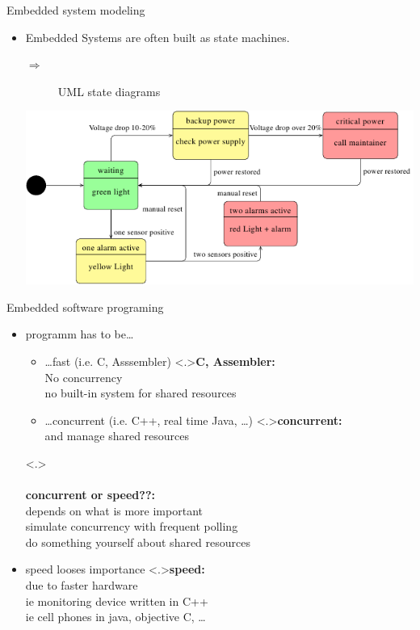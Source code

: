 \documentclass[ngerman={babel}, utf8, bigger, xcolor={table,dvipsnames}, ompress, hyperref={bookmarks,colorlinks}]{beamer}
\begin{document}
\begin{frame}{Embedded system modeling}
	\begin{itemize}
		\item Embedded Systems are often built as state machines.
		\begin{description}
			\item[ $\Rightarrow$] UML state diagrams
		\end{description}
		\hspace{-1em}\includegraphics[scale=.6]{rad-warner-state.png}
	\end{itemize}
\end{frame}

\begin{frame}{Embedded software programing}
	\begin{itemize}
		\item programm has to be\dots
			\begin{itemize}
				\item \dots fast (i.e. C, Asssembler)
				\note<.>{\textbf{C, Assembler:}\\ No concurrency \\ no built-in system for shared resources}
				\item \dots concurrent (i.e. C++, real time Java, \dots){}
				\note<.>{\textbf{concurrent:}\\ and manage shared resources}
			\end{itemize}
			\note<.>{\\ \ \\ \textbf{concurrent or speed??:}\\ depends on what is more important \\ simulate concurrency with frequent polling \\ do something yourself about shared resources}
			\item speed looses importance
			\note<.>{\textbf{speed:}\\ due to faster hardware \\ ie monitoring device written in C++ \\ ie cell phones in java, objective C, \dots}
	\end{itemize}
\end{frame}
\end{document}
